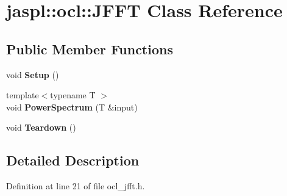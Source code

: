 \hypertarget{classjaspl_1_1ocl_1_1_j_f_f_t}{}\section{jaspl\+:\+:ocl\+:\+:J\+F\+FT Class Reference}
\label{classjaspl_1_1ocl_1_1_j_f_f_t}
\subsection*{Public Member Functions}
\begin{DoxyCompactItemize}
\item 
void {\bfseries Setup} ()\hypertarget{classjaspl_1_1ocl_1_1_j_f_f_t_ad68656a8859214cea4bb4ed5dca93995}{}\label{classjaspl_1_1ocl_1_1_j_f_f_t_ad68656a8859214cea4bb4ed5dca93995}

\item 
{\footnotesize template$<$typename T $>$ }\\void {\bfseries Power\+Spectrum} (T \&input)\hypertarget{classjaspl_1_1ocl_1_1_j_f_f_t_a2d41202ab9b3231f1c347cd8cbc465f3}{}\label{classjaspl_1_1ocl_1_1_j_f_f_t_a2d41202ab9b3231f1c347cd8cbc465f3}

\item 
void {\bfseries Teardown} ()\hypertarget{classjaspl_1_1ocl_1_1_j_f_f_t_aca6fb3c6a7f7d7c7d04aeac51b2b8c2f}{}\label{classjaspl_1_1ocl_1_1_j_f_f_t_aca6fb3c6a7f7d7c7d04aeac51b2b8c2f}

\end{DoxyCompactItemize}


\subsection{Detailed Description}


Definition at line 21 of file ocl\+\_\+jfft.\+h.

